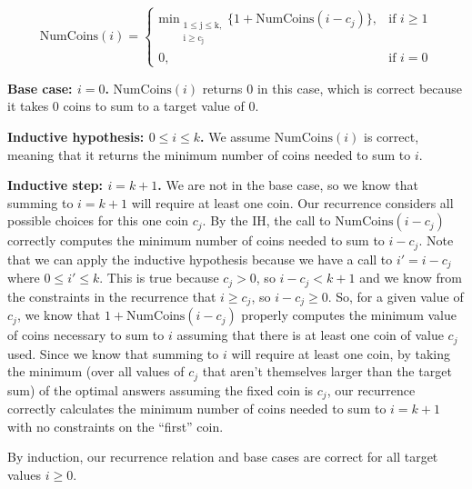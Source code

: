 \documentclass[11pt]{article}
\begin{document}
\[
    \mathrm{NumCoins}(i) = 
\begin{cases}
    \mathrm{min_\substack{1 \leq j \leq k, \\ i \geq c_j}}\{ 1+ \mathrm{NumCoins}(i - c_j) \},& \text{if } i\geq 1\\
    0,              & \text{if } i=0
\end{cases}
\]

\textbf{Base case: $i = 0$.} $\mathrm{NumCoins}(i)$ returns 0 in this case, which is correct because it takes 0 coins to sum to a target value of 0.

\textbf{Inductive hypothesis: $0 \leq i \leq k$.} We assume $\mathrm{NumCoins}(i)$ is correct, meaning that it returns the minimum number of coins needed to sum to $i$.

\textbf{Inductive step: $i = k + 1$.} We are not in the base case, so we know that summing to $i = k+1$ will require at least one coin. Our recurrence considers all possible choices for this one coin $c_j$. By the IH, the call to $\mathrm{NumCoins}(i - c_j)$ correctly computes the minimum number of coins needed to sum to $i - c_j$. Note that we can apply the inductive hypothesis because we have a call to $i' = i - c_j$ where $0 \leq i' \leq k$. This is true because $c_j > 0$, so $i - c_j < k+1 $ and we know from the constraints in the recurrence that $i \geq c_j$, so $i - c_j \geq 0$. So, for a given value of $c_j$, we know that $1+ \mathrm{NumCoins}(i - c_j)$ properly computes the minimum value of coins necessary to sum to $i$ assuming that there is at least one coin of value $c_j$ used. Since we know that summing to $i$ will require at least one coin, by taking the minimum (over all values of $c_j$ that aren't themselves larger than the target sum) of the optimal answers assuming the fixed coin is $c_j$, our recurrence correctly calculates the minimum number of coins needed to sum to $i = k+1$ with no constraints on the ``first'' coin.

By induction, our recurrence relation and base cases are correct for all target values $i \geq 0$.
\end{document}
